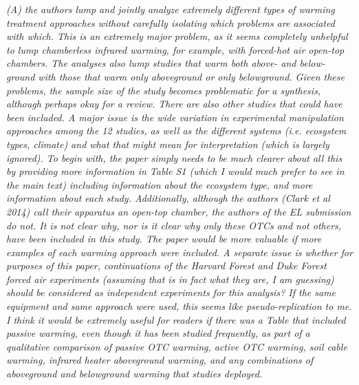 \documentclass[11pt,a4paper]{letter}
\begin{document}
\par \emph{(A) the authors lump and jointly analyze extremely different types of warming treatment approaches without carefully isolating which problems are associated with which. This is an extremely major problem, as it seems completely unhelpful to lump chamberless infrared warming, for example, with forced-hot air open-top chambers. The analyses also lump studies that warm both above- and below-ground with those that warm only aboveground or only belowground. Given these problems, the sample size of the study becomes problematic for a synthesis, although perhaps okay for a review. There are also other studies that could have been included. A major issue is the wide variation in experimental manipulation approaches among the 12 studies, as well as the different systems (i.e. ecosystem types, climate) and what that might mean for interpretation (which is largely ignored). To begin with, the paper simply needs to be much clearer about all this by providing more information in Table S1 (which I would much prefer to see in the main text) including information about the ecosystem type, and more information about each study. Additionally, although the authors (Clark et al 2014) call their apparatus an open-top chamber, the authors of the EL submission do not. It is not clear why, nor is it clear why only these OTCs and not others, have been included in this study. The paper would be more valuable if more examples of each warming approach were included. A separate issue is whether for purposes of this paper, continuations of the Harvard Forest and Duke Forest forced air experiments (assuming that is in fact what they are, I am guessing) should be considered as independent experiments for this analysis? If the same equipment and same approach were used, this seems like pseudo-replication to me. I think it would be extremely useful for readers if there was a Table that included passive warming, even though it has been studied frequently, as part of a qualitative comparison of passive OTC warming, active OTC warming, soil cable warming, infrared heater aboveground warming, and any combinations of aboveground and belowground warming that studies deployed.}
\end{document}
